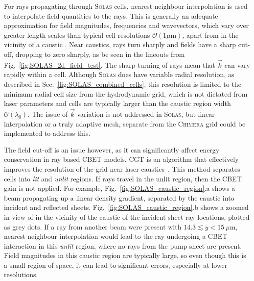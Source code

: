 For rays propagating through \textsc{Solas} cells, nearest neighbour interpolation is used to interpolate field quantities to the rays.
This is generally an adequate approximation for field magnitudes, frequencies and wavevectors, which vary over greater length scales than typical cell resolutions $\mathcal{O}(1 \mu\text{m})$, apart from in the vicinity of a caustic \cite{follett_validation_2022}.
Near caustics, rays turn sharply and fields have a sharp cut-off, dropping to zero sharply, as be seen in the lineouts from Fig.~\ref{fig:SOLAS_2d_field_test}.
The sharp turning of rays mean that $\vec{k}$ can vary rapidly within a cell.
Although \textsc{Solas} does have variable radial resolution, as described in Sec.~\ref{fig:SOLAS_combined_cells}, this resolution is limited to the minimum radial cell size from the hydrodynamic grid, which is not dictated from laser parameters and cells are typically larger than the caustic region width $\mathcal{O}(\lambda_0)$.
The issue of $\vec{k}$ variation is not addressed in \textsc{Solas}, but linear interpolation or a truly adaptive mesh, separate from the \textsc{Chimera} grid could be implemented to address this.

The field cut-off is an issue however, as it can significantly affect energy conservation in ray based \ac{CBET} models.
\ac{CGT} is an algorithm that effectively improves the resolution of the grid near laser caustics~\cite{follett_ray-based_2018}.
This method separates cells into \textit{lit} and \textit{unlit} regions.
If rays travel in the unlit region, then the \ac{CBET} gain is not applied.
For example, Fig.~\ref{fig:SOLAS_caustic_region}.a shows a beam propagating up a linear density gradient, separated by the caustic into incident and reflected sheets.
Fig.~\ref{fig:SOLAS_caustic_region}.b shows a zoomed in view of in the vicinity of the caustic of the incident sheet ray locations, plotted as grey dots.
If a ray from another beam were present with $14.3 \lesssim y < 15\ \mu\text{m}$, nearest neighbour interpolation would lead to the ray undergoing a \ac{CBET} interaction in this \textit{unlit} region, where no rays from the pump sheet are present.
Field magnitudes in this caustic region are typically large, so even though this is a small region of space, it can lead to significant errors, especially at lower resolutions.

